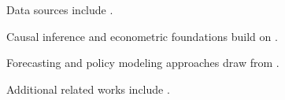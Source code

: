 

Data sources include \cite{HouseholdSurvey2023,IMFIFS2024,WorldBankWDI2024,NationalStatsVAT2024,ipums2025}.

Causal inference and econometric foundations build on \cite{bareinboim2023,bareinboim2023fusion,heckman2008,heckman2008econometric,heckman2023}.

Forecasting and policy modeling approaches draw from \cite{bankofcanada2023,bankofcanada2023ml,fred2025,econmodel2023,imf2023ai,imf2023aii,imf2023fiscal}.

Additional related works include \cite{FusedMacroMicro2024,bds2025,garcia2020,main,policy2020hal,sekhansen2023,sekhansen2023ml,sekhansen2023mlpolicy,shephard2023dynamic,shephard2023nonparametric}.


